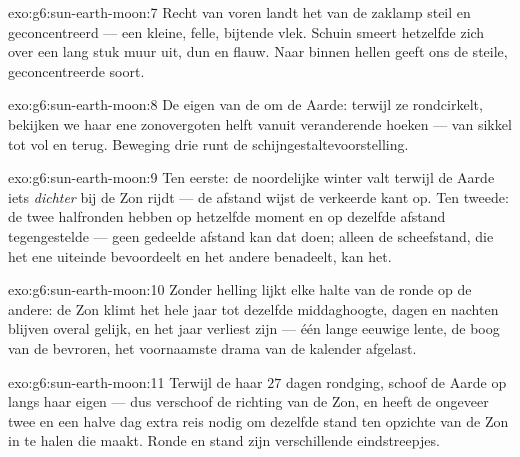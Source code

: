 \begin{solution}{exo:g6:sun-earth-moon:7}
Recht van voren landt het  van de zaklamp steil en
geconcentreerd --- een kleine, felle, bijtende vlek. Schuin smeert
hetzelfde  zich over een lang stuk muur uit, dun en flauw. Naar
binnen hellen geeft ons de steile, geconcentreerde soort.
\end{solution}

\begin{solution}{exo:g6:sun-earth-moon:8}
De eigen  van de  om de Aarde: terwijl ze
rondcirkelt, bekijken we haar ene zonovergoten helft vanuit
veranderende hoeken --- van sikkel tot vol en terug. Beweging drie runt
de schijngestaltevoorstelling.
\end{solution}

\begin{solution}{exo:g6:sun-earth-moon:9}
Ten eerste: de noordelijke winter valt terwijl de Aarde iets
\emph{dichter} bij de Zon rijdt --- de afstand wijst de verkeerde
kant op. Ten tweede: de twee halfronden hebben op hetzelfde moment en
op dezelfde afstand tegengestelde  --- geen gedeelde afstand
kan dat doen; alleen de scheefstand, die het ene uiteinde bevoordeelt
en het andere benadeelt, kan het.
\end{solution}

\begin{solution}{exo:g6:sun-earth-moon:10}
Zonder helling lijkt elke halte van de ronde op de andere: de Zon
klimt het hele jaar tot dezelfde middaghoogte, dagen en nachten
blijven overal gelijk, en het jaar verliest zijn  --- één
lange eeuwige lente, de boog van de  bevroren, het
voornaamste drama van de kalender afgelast.
\end{solution}

\begin{solution}{exo:g6:sun-earth-moon:11}
Terwijl de  haar $27$ dagen rondging, schoof de Aarde op langs
haar eigen  --- dus verschoof de richting van de Zon, en
heeft de  ongeveer twee en een halve dag extra reis nodig om
dezelfde stand ten opzichte van de Zon in te halen die 
maakt. Ronde en stand zijn verschillende eindstreepjes.
\end{solution}

